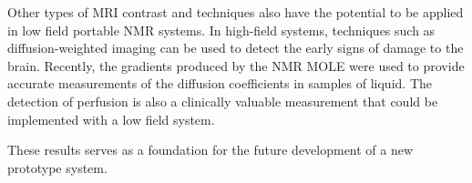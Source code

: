 Other types of MRI contrast and techniques also have the potential to be applied in low field portable NMR systems.
In high-field systems, techniques such as diffusion-weighted imaging can be used to detect the early signs of damage to the brain.
Recently, the gradients produced by the NMR MOLE were used to provide accurate measurements of the diffusion coefficients in samples of liquid.
The detection of perfusion is also a clinically valuable measurement that could be implemented with a low field system.

These results serves as a foundation for the future development of a new prototype system.
